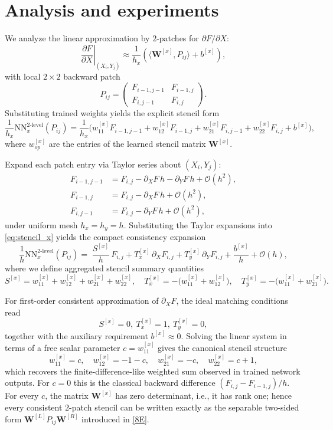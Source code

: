 \documentclass[pdflatex,sn-mathphys-num]{sn-jnl}%
\theoremstyle{thmstyleone}%
\theoremstyle{thmstyletwo}%
\theoremstyle{thmstylethree}%
\begin{document}
\section{Analysis and experiments}{\label{sec:analysis}
We analyze the linear approximation by $2$-patches for $\partial F/\partial X$:
\[
\left.\frac{\partial F}{\partial X}\right|_{(X_i,Y_j)}\approx \frac{1}{h_x}\left(\langle\boldsymbol{W}^{[x]}, P_{ij}\rangle + b^{[x]}\right),
\]
with local $2\times 2$ backward patch
\[
P_{ij}=\begin{pmatrix}
F_{i-1,j-1}& F_{i-1,j}\\
F_{i,j-1}& F_{i,j}
\end{pmatrix}.
\]
Substituting trained weights yields the explicit stencil form
\begin{equation}\label{eq:stencil_x}
\frac{1}{h_x}\mathrm{NN}^{2\text{-level}}_x(P_{ij})= \frac{1}{h_x}\big(w_{11}^{[x]} F_{i-1,j-1}+w_{12}^{[x]}F_{i-1,j} +w_{21}^{[x]}F_{i,j-1}+w_{22}^{[x]} F_{i,j}+b^{[x]}\big),
\end{equation}
where $w_{op}^{[x]}$ are the entries of the learned stencil matrix $\boldsymbol{W}^{[x]}$.

Expand each patch entry via Taylor series about $(X_i,Y_j)$:
\begin{align*}
F_{i-1,j-1}&=F_{i,j}-\partial_X F\,h-\partial_Y F\,h+\mathcal{O}(h^2),\\
F_{i-1,j}&=F_{i,j}-\partial_X F\,h+\mathcal{O}(h^2),\\
F_{i,j-1}&=F_{i,j}-\partial_Y F\,h+\mathcal{O}(h^2),
\end{align*}
under uniform mesh $h_x=h_y=h$. Substituting the Taylor expansions into \eqref{eq:stencil_x} yields the compact consistency expansion
\begin{equation}\label{eq:consistency_x}
\frac{1}{h}\mathrm{NN}^{2\text{-level}}_x(P_{ij})
=\;
\frac{S^{[x]}}{h}\,F_{i,j} 
+T_x^{[x]}\,\partial_X F_{i,j}
+T_y^{[x]}\,\partial_Y F_{i,j}
+\frac{b^{[x]}}{h}+\mathcal{O}(h),
\end{equation}
where we define aggregated stencil summary quantities
\[
S^{[x]} = w_{11}^{[x]}+w_{12}^{[x]}+w_{21}^{[x]}+w_{22}^{[x]},\quad
T_x^{[x]} = -\big(w_{11}^{[x]}+w_{12}^{[x]}\big),\quad
T_y^{[x]} = -\big(w_{11}^{[x]}+w_{21}^{[x]}\big).
\]

For first-order consistent approximation of $\partial_X F$, the ideal matching conditions read
\[
S^{[x]}=0,\ T_x^{[x]}=1,\ T_y^{[x]}=0,
\]
together with the auxiliary requirement $b^{[x]}\approx 0.$ Solving the linear system in terms of a free scalar parameter $c = w_{11}^{[x]}$ gives the canonical stencil structure
\[
w_{11}^{[x]}=c,\quad w_{12}^{[x]}=-1-c,\quad w_{21}^{[x]}=-c,\quad w_{22}^{[x]}=c+1,
\]
which recovers the finite-difference-like weighted sum observed in trained network outputs. For $c=0$ this is the classical backward difference $(F_{i,j}-F_{i-1,j})/h$. For every $c$, the matrix $\boldsymbol{W}^{[x]}$ has zero determinant, i.e., it has rank one; hence every consistent $2$-patch stencil can be written exactly as the separable two-sided form $\boldsymbol{W}^{[L]}P_{ij}\boldsymbol{W}^{[R]}$ introduced in \eqref{8E}.

}
\end{document}
